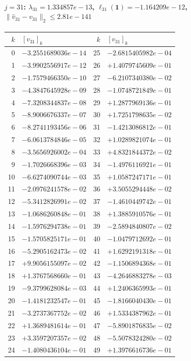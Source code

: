 \documentclass[11pt]{article}
\begin{document}
\paragraph{$j = 31$: $\lambda_{31} = 1.334857e-13$, \quad $\ell_{31}(\mathbf{1}) = -1.164209e-12$, \quad $\|\hat{v}_{31} - v_{31}\|_2 \leq 2.81e-141$}
\begin{center}
{\footnotesize
\begin{tabular}{r@{\;\;}l@{\quad}r@{\;\;}l}
\toprule
$k$ & $[v_{31}]_k$ & $k$ & $[v_{31}]_k$ \\
\midrule
0 & $-3.2551689036e-14$ & 25 & $-2.6815405982e-04$ \\
1 & $-3.9902556917e-12$ & 26 & $+1.4079745609e-01$ \\
2 & $-1.7579466350e-10$ & 27 & $-6.2107340380e-02$ \\
3 & $-4.3847645928e-09$ & 28 & $-1.0748721849e-01$ \\
4 & $-7.3208344837e-08$ & 29 & $+1.2877969136e-01$ \\
5 & $-8.9006676337e-07$ & 30 & $+1.7251798635e-02$ \\
6 & $-8.2741193456e-06$ & 31 & $-1.4213086812e-01$ \\
7 & $-6.0613784846e-05$ & 32 & $+1.0289821074e-01$ \\
8 & $-3.5656926002e-04$ & 33 & $+4.8321844372e-02$ \\
9 & $-1.7026668396e-03$ & 34 & $-1.4976116921e-01$ \\
10 & $-6.6274090744e-03$ & 35 & $+1.0587247171e-01$ \\
11 & $-2.0976241578e-02$ & 36 & $+3.5055294448e-02$ \\
12 & $-5.3412826991e-02$ & 37 & $-1.4610449742e-01$ \\
13 & $-1.0686260848e-01$ & 38 & $+1.3885910576e-01$ \\
14 & $-1.5976294738e-01$ & 39 & $-2.5894840807e-02$ \\
15 & $-1.5705825171e-01$ & 40 & $-1.0479712692e-01$ \\
16 & $-5.2905162473e-02$ & 41 & $+1.6292191318e-01$ \\
17 & $+9.9056155097e-02$ & 42 & $-1.1506894368e-01$ \\
18 & $+1.3767568660e-01$ & 43 & $-4.2646883278e-03$ \\
19 & $-9.3799628084e-03$ & 44 & $+1.2406365993e-01$ \\
20 & $-1.4181232547e-01$ & 45 & $-1.8166040430e-01$ \\
21 & $-3.2737367752e-02$ & 46 & $+1.5334387962e-01$ \\
22 & $+1.3689481614e-01$ & 47 & $-5.8901876835e-02$ \\
23 & $+3.3597207357e-02$ & 48 & $-5.5078324280e-02$ \\
24 & $-1.4080436104e-01$ & 49 & $+1.3976616736e-01$ \\
\bottomrule
\end{tabular}
}
\end{center}
\end{document}
